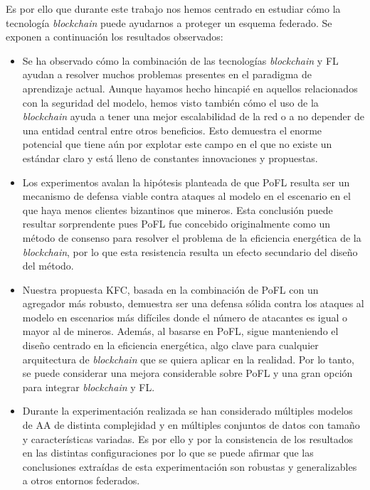 Es por ello que durante este trabajo nos hemos centrado en estudiar cómo la tecnología \textit{blockchain} puede ayudarnos a proteger un esquema federado. Se exponen a continuación los resultados observados:
\begin{itemize}
    \item Se ha observado cómo la combinación de las tecnologías \textit{blockchain} y \ac{FL} ayudan a resolver muchos problemas presentes en el paradigma de aprendizaje actual. Aunque hayamos hecho hincapié en aquellos relacionados con la seguridad del modelo, hemos visto también cómo el uso de la \textit{blockchain} ayuda a tener una mejor escalabilidad de la red o a no depender de una entidad central entre otros beneficios. Esto demuestra el enorme potencial que tiene aún por explotar este campo en el que no existe un estándar claro y está lleno de constantes innovaciones y propuestas.
    
    \item Los experimentos avalan la hipótesis planteada de que \ac{PoFL} resulta ser un mecanismo de defensa viable contra ataques al modelo en el escenario en el que haya menos clientes bizantinos que mineros. Esta conclusión puede resultar sorprendente pues \ac{PoFL} fue concebido originalmente como un método de consenso para resolver el problema de la eficiencia energética de la \textit{blockchain}, por lo que esta resistencia resulta un efecto secundario del diseño del método.
    
    \item Nuestra propuesta \ac{KFC}, basada en la combinación de \ac{PoFL} con un agregador más robusto, demuestra ser una defensa sólida contra los ataques al modelo en escenarios más difíciles donde el número de atacantes es igual o mayor al de mineros. Además, al basarse en \ac{PoFL}, sigue manteniendo el diseño centrado en la eficiencia energética, algo clave para cualquier arquitectura de \textit{blockchain} que se quiera aplicar en la realidad. Por lo tanto, se puede considerar una mejora considerable sobre \ac{PoFL} y una gran opción para integrar \textit{blockchain} y \ac{FL}.

    \item Durante la experimentación realizada se han considerado múltiples modelos de \ac{AA} de distinta complejidad y en múltiples conjuntos de datos con tamaño y características variadas. Es por ello y por la consistencia de los resultados en las distintas configuraciones por lo que se puede afirmar que las conclusiones extraídas de esta experimentación son robustas y generalizables a otros entornos federados.
    
\end{itemize}



